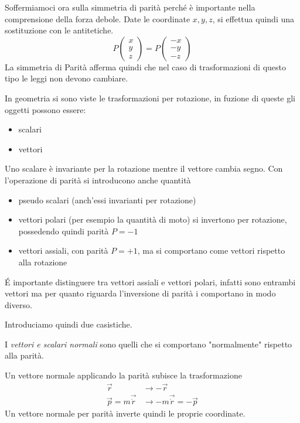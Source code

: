 Soffermiamoci ora sulla simmetria di parità perché è importante nella comprensione della forza debole.
Date le coordinate $x, y, z$, si effettua quindi una sostituzione con le antitetiche.
\begin{equation}
P
\begin{pmatrix}
x\\y\\z
\end{pmatrix}
=
P
\begin{pmatrix}
-x\\-y\\-z
\end{pmatrix}
\end{equation}
La simmetria di Parità afferma quindi che nel caso di trasformazioni di questo tipo le leggi non devono cambiare.

In geometria si sono viste le trasformazioni per rotazione, in fuzione di queste gli oggetti possono essere:
\begin{itemize}
\item scalari
\item vettori
\end{itemize}
Uno scalare è invariante per la rotazione mentre il vettore cambia segno.
Con l'operazione di parità si introducono anche quantità
\begin{itemize}
\item pseudo scalari (anch'essi invarianti per rotazione)
\item vettori polari (per esempio la quantità di moto) si invertono per rotazione, possedendo quindi parità $P=-1$
\item vettori assiali, con parità $P=+1$, ma si comportano come vettori rispetto alla rotazione
\end{itemize}
\'E importante distinguere tra vettori assiali e vettori polari, infatti sono entrambi vettori ma per quanto riguarda l'inversione di parità i comportano in modo diverso.

Introduciamo quindi due casistiche.

I \emph{vettori e scalari normali} sono quelli che si comportano "normalmente" rispetto alla parità.

Un vettore normale applicando la parità subisce la trasformazione
\begin{equation}
\begin{split}
\vec{r}&\to -\vec{r}\\
\vec{p}=m\vec{\dot{r}}&\to  -m\vec{\dot{r}}=-\vec{p}
\end{split}
\end{equation}
Un vettore normale per parità inverte quindi le proprie coordinate.

